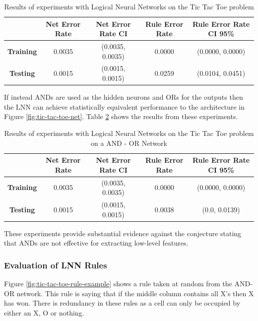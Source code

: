 \begin{table}[H]
	\begin{center}
		\begin{tabular}{| c | c | c | c | c |}
			\hline
			\textbf{} & \textbf{Net Error Rate} & \textbf{Net Error Rate CI} & \textbf{Rule Error Rate} & \textbf{Rule Error Rate CI 95\%}\\
			\hline
			\hline
			\textbf{Training} & 0.0035 & (0.0035, 0.0035) & 0.0000 & (0.0000, 0.0000)\\
			\textbf{Testing} & 0.0015 & (0.0015, 0.0015) & 0.0259 & (0.0104, 0.0451)\\
			\hline
		\end{tabular}
	\end{center}
	\caption{Results of experiments with Logical Neural Networks on the Tic Tac Toe problem}
	\label{tab:tic-tac-toe-lnn-peformance-results}
\end{table}

If instead ANDs are used as the hidden neurons and ORs for the outputs then the LNN can achieve statistically equivalent performance to the architecture in Figure \ref{fig:tic-tac-toe-net}. Table \ref{tab:tic-tac-toe-lnn-peformance-results-and-or} shows the results from these experiments.

\begin{table}[H]
	\begin{center}
		\begin{tabular}{| c | c | c | c | c |}
			\hline
			\textbf{} & \textbf{Net Error Rate} & \textbf{Net Error Rate CI} & \textbf{Rule Error Rate} & \textbf{Rule Error Rate CI 95\%}\\
			\hline
			\hline
			\textbf{Training} & 0.0035 & (0.0035, 0.0035) & 0.0000 & (0.0000, 0.0000)\\
			\textbf{Testing} & 0.0015 & (0.0015, 0.0015) & 0.0038 & (0.0, 0.0139)\\
			\hline
		\end{tabular}
	\end{center}
	\caption{Results of experiments with Logical Neural Networks on the Tic Tac Toe problem on a AND - OR Network}
	\label{tab:tic-tac-toe-lnn-peformance-results-and-or}
\end{table}

These experiments provide substantial evidence against the conjecture stating that ANDs are not effective for extracting low-level features.

\subsubsection{Evaluation of LNN Rules}
Figure \ref{fig:tic-tac-toe-rule-example} shows a rule taken at random from the AND-OR network. This rule is saying that if the middle column contains all X's then X has won. There is redundancy in these rules as a cell can only be occupied by either an X, O or nothing.

